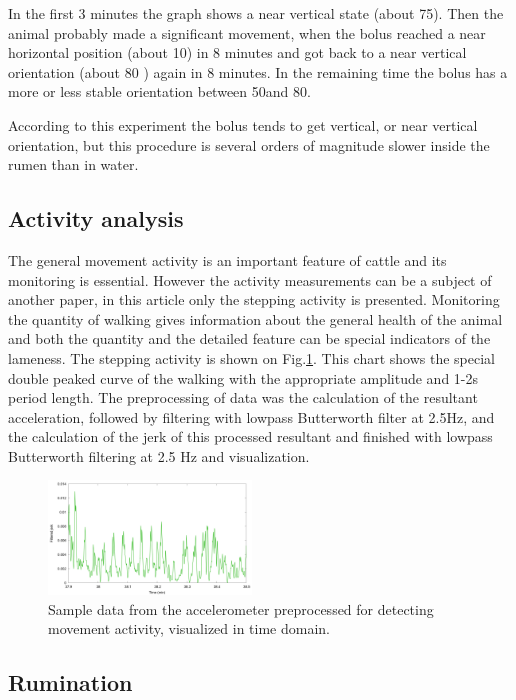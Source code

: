 \documentclass[conference]{IEEEtran}
\begin{document}
In the first 3 minutes the graph shows a near vertical state (about
75\textdegree). Then the animal probably made a significant movement, when the
bolus reached a near horizontal position (about 10\textdegree) in 8 minutes and
got back to a near vertical orientation (about 80 \textdegree) again in 8
minutes. In the remaining time the bolus has a more or less stable orientation
between 50\textdegree and 80\textdegree.

According to this experiment the bolus tends to get vertical, or near
vertical orientation, but this procedure is several orders of magnitude slower
inside the rumen than in water.

\subsection{Activity analysis}

The general movement activity is an important feature of cattle and its
monitoring  is essential. However the activity measurements can be a subject of
another paper, in this article only the stepping activity  is presented.
Monitoring the quantity of walking gives information about the general health
of the animal and both the quantity and the detailed feature can be special
indicators of the lameness. The stepping activity is shown on
Fig.\ref{walking}. This chart shows the special double peaked curve of the
walking with the appropriate amplitude and 1-2s period length. The preprocessing
of data was the calculation of the resultant acceleration, followed by
filtering with lowpass Butterworth filter at 2.5Hz, and the calculation of the
jerk of this processed resultant and finished with lowpass Butterworth
filtering at 2.5 Hz and visualization.

\begin{figure}[htbp]
\centerline{\includegraphics[width=0.48\textwidth]{fig/plot_ker.png}}
  \caption{Sample data from the accelerometer preprocessed for detecting movement activity, visualized
  in time domain.}
\label{walking}
\end{figure}

\subsection{Rumination}
\end{document}

